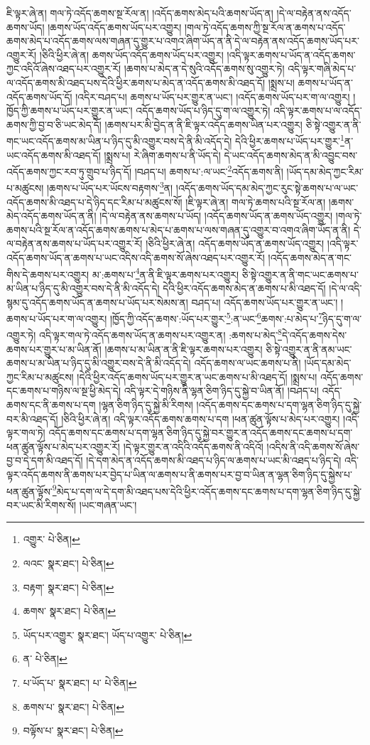ཇི་ལྟར་ཞེ་ན། གལ་ཏེ་འདོད་ཆགས་སྔ་རོལ་ན། །འདོད་ཆགས་མེད་པའི་ཆགས་ཡོད་ན། །དེ་ལ་བརྟེན་ནས་འདོད་ཆགས་ཡོད། །ཆགས་ཡོད་འདོད་ཆགས་ཡོད་པར་འགྱུར། །གལ་ཏེ་འདོད་ཆགས་ཀྱི་སྔ་རོལ་ན་ཆགས་པ་འདོད་ཆགས་མེད་པ་འདོད་ཆགས་ལས་གཞན་དུ་གྱུར་པ་འགའ་ཞིག་ཡོད་ན་ནི་དེ་ལ་བརྟེན་ནས་འདོད་ཆགས་ཡོད་པར་འགྱུར་རོ། །ཅིའི་ཕྱིར་ཞེ་ན། ཆགས་ཡོད་འདོད་ཆགས་ཡོད་པར་འགྱུར། །འདི་ལྟར་ཆགས་པ་ཡོད་ན་འདོད་ཆགས་ཀྱང་འདིའོ་ཞེས་འཐད་པར་འགྱུར་རོ། །ཆགས་པ་མེད་ན་དེ་སུའི་འདོད་ཆགས་སུ་འགྱུར་ཏེ། འདི་ལྟར་གཞི་མེད་པ་ལ་འདོད་ཆགས་མི་འཐད་པས་དེའི་ཕྱིར་ཆགས་པ་མེད་ན་འདོད་ཆགས་མི་འཐད་དོ། །སྨྲས་པ། ཆགས་པ་ཡོད་ན་འདོད་ཆགས་ཡོད་དོ། །འདིར་བཤད་པ། ཆགས་པ་ཡོད་པར་གྱུར་ན་ཡང་། །འདོད་ཆགས་ཡོད་པར་ག་ལ་འགྱུར། །ཁྱོད་ཀྱི་ཆགས་པ་ཡོད་པར་གྱུར་ན་ཡང་། འདོད་ཆགས་ཡོད་པ་ཉིད་དུ་ག་ལ་འགྱུར་ཏེ། འདི་ལྟར་ཆགས་པ་ལ་འདོད་ཆགས་ཀྱི་བྱ་བ་ཅི་ཡང་མེད་དོ། །ཆགས་པར་མི་བྱེད་ན་ནི་ཇི་ལྟར་འདོད་ཆགས་ཡིན་པར་འགྱུར། ཅི་སྟེ་འགྱུར་ན་ནི་གང་ཡང་འདོད་ཆགས་མ་ཡིན་པ་ཉིད་དུ་མི་འགྱུར་བས་དེ་ནི་མི་འདོད་དེ། དེའི་ཕྱིར་ཆགས་པ་ཡོད་པར་གྱུར་\footnote{འགྱུར་  པེ་ཅིན། }ན་ཡང་འདོད་ཆགས་མི་འཐད་དོ། །སྨྲས་པ། རེ་ཞིག་ཆགས་པ་ནི་ཡོད་དེ། དེ་ཡང་འདོད་ཆགས་མེད་ན་མི་འབྱུང་བས་འདོད་ཆགས་ཀྱང་རབ་ཏུ་གྲུབ་པ་ཉིད་དོ། །བཤད་པ། ཆགས་པ་:ལ་ཡང་\footnote{ལའང་  སྣར་ཐང་།  པེ་ཅིན། }འདོད་ཆགས་ནི། །ཡོད་དམ་མེད་ཀྱང་རིམ་པ་མཚུངས། །ཆགས་པ་ཡོད་པར་ཡོངས་བརྟགས་\footnote{བརྟག་  སྣར་ཐང་།  པེ་ཅིན། }ན། །འདོད་ཆགས་ཡོད་དམ་མེད་ཀྱང་རུང་སྟེ་ཆགས་པ་ལ་ཡང་འདོད་ཆགས་མི་འཐད་པ་དེ་ཉིད་དང་རིམ་པ་མཚུངས་སོ། །ཇི་ལྟར་ཞེ་ན། གལ་ཏེ་ཆགས་པའི་སྔ་རོལ་ན། །ཆགས་མེད་འདོད་ཆགས་ཡོད་ན་ནི། །དེ་ལ་བརྟེན་ནས་ཆགས་པ་ཡོད། །འདོད་ཆགས་ཡོད་ན་ཆགས་ཡོད་འགྱུར། །གལ་ཏེ་ཆགས་པའི་སྔ་རོལ་ན་འདོད་ཆགས་ཆགས་པ་མེད་པ་ཆགས་པ་ལས་གཞན་དུ་འགྱུར་བ་འགའ་ཞིག་ཡོད་ན་ནི། དེ་ལ་བརྟེན་ནས་ཆགས་པ་ཡོད་པར་འགྱུར་རོ། །ཅིའི་ཕྱིར་ཞེ་ན། འདོད་ཆགས་ཡོད་ན་ཆགས་ཡོད་འགྱུར། །འདི་ལྟར་འདོད་ཆགས་ཡོད་ན་ཆགས་པ་ཡང་འདིས་འདི་ཆགས་སོ་ཞེས་འཐད་པར་འགྱུར་རོ། །འདོད་ཆགས་མེད་ན་གང་གིས་དེ་ཆགས་པར་འགྱུར། མ་:ཆགས་པ་\footnote{ཆགས་  སྣར་ཐང་།  པེ་ཅིན། }ན་ནི་ཇི་ལྟར་ཆགས་པར་འགྱུར། ཅི་སྟེ་འགྱུར་ན་ནི་གང་ཡང་ཆགས་པ་མ་ཡིན་པ་ཉིད་དུ་མི་འགྱུར་བས་དེ་ནི་མི་འདོད་དེ། དེའི་ཕྱིར་འདོད་ཆགས་མེད་ན་ཆགས་པ་མི་འཐད་དོ། །དེ་ལ་འདི་སྙམ་དུ་འདོད་ཆགས་ཡོད་ན་ཆགས་པ་ཡོད་པར་སེམས་ན། བཤད་པ། འདོད་ཆགས་ཡོད་པར་གྱུར་ན་ཡང་། །ཆགས་པ་ཡོད་པར་ག་ལ་འགྱུར། །ཁྱོད་ཀྱི་འདོད་ཆགས་:ཡོད་པར་གྱུར་\footnote{ཡོད་པར་འགྱུར་  སྣར་ཐང་། ཡོད་པ་འགྱུར་  པེ་ཅིན། }:ན་ཡང་\footnote{ན་  པེ་ཅིན། }ཆགས་:པ་མེད་པ་\footnote{པ་ཡོད་པ་  སྣར་ཐང་། པ་  པེ་ཅིན། }ཉིད་དུ་ག་ལ་འགྱུར་ཏེ། འདི་ལྟར་གལ་ཏེ་འདོད་ཆགས་ཡོད་ན་ཆགས་པར་འགྱུར་ན། :ཆགས་པ་མེད་\footnote{ཆགས་པ་  སྣར་ཐང་།  པེ་ཅིན། }དེ་འདོད་ཆགས་དེས་ཆགས་པར་གྱུར་པ་མ་ཡིན་ནོ། །ཆགས་པ་མ་ཡིན་ན་ནི་ཇི་ལྟར་ཆགས་པར་འགྱུར། ཅི་སྟེ་འགྱུར་ན་ནི་ནམ་ཡང་ཆགས་པ་མ་ཡིན་པ་ཉིད་དུ་མི་འགྱུར་བས་དེ་ནི་མི་འདོད་དེ། འདོད་ཆགས་ལ་ཡང་ཆགས་པ་ནི། །ཡོད་དམ་མེད་ཀྱང་རིམ་པ་མཚུངས། །དེའི་ཕྱིར་འདོད་ཆགས་ཡོད་པར་གྱུར་ན་ཡང་ཆགས་པ་མི་འཐད་དོ། །སྨྲས་པ། འདོད་ཆགས་དང་ཆགས་པ་གཉིས་ལ་སྔ་ཕྱི་མེད་དེ། འདི་ལྟར་དེ་གཉིས་ནི་ལྷན་ཅིག་ཉིད་དུ་སྐྱེ་བ་ཡིན་ནོ། །བཤད་པ། འདོད་ཆགས་དང་ནི་ཆགས་པ་དག །ལྷན་ཅིག་ཉིད་དུ་སྐྱེ་མི་རིགས། །འདོད་ཆགས་དང་ཆགས་པ་དག་ལྷན་ཅིག་ཉིད་དུ་སྐྱེ་བར་མི་འཐད་དོ། །ཅིའི་ཕྱིར་ཞེ་ན། འདི་ལྟར་འདོད་ཆགས་ཆགས་པ་དག །ཕན་ཚུན་ལྟོས་པ་མེད་པར་འགྱུར། །འདི་ལྟར་གལ་ཏེ། འདོད་ཆགས་དང་ཆགས་པ་དག་ལྷན་ཅིག་ཉིད་དུ་སྐྱེ་བར་གྱུར་ན་འདོད་ཆགས་དང་ཆགས་པ་དག་ཕན་ཚུན་ལྟོས་པ་མེད་པར་འགྱུར་རོ། །དེ་ལྟར་གྱུར་ན་འདིའི་འདོད་ཆགས་ནི་འདིའོ། །འདིས་ནི་འདི་ཆགས་སོ་ཞེས་བྱ་བ་དེ་དག་མི་འཐད་དོ། །དེ་དག་མེད་ན་འདོད་ཆགས་མི་འཐད་པ་ཉིད་ལ་ཆགས་པ་ཡང་མི་འཐད་པ་ཉིད་དེ། འདི་ལྟར་འདོད་ཆགས་ནི་ཆགས་པར་བྱེད་པ་ཡིན་ལ་ཆགས་པ་ནི་ཆགས་པར་བྱ་བ་ཡིན་ན་ལྷན་ཅིག་ཉིད་དུ་སྐྱེས་པ་ཕན་ཚུན་ལྟོས་\footnote{བལྟོས་པ་  སྣར་ཐང་།  པེ་ཅིན། }མེད་པ་དག་ལ་དེ་དག་མི་འཐད་པས་དེའི་ཕྱིར་འདོད་ཆགས་དང་ཆགས་པ་དག་ལྷན་ཅིག་ཉིད་དུ་སྐྱེ་བར་ཡང་མི་རིགས་སོ། །ཡང་གཞན་ཡང་། 